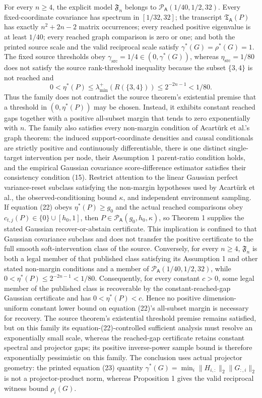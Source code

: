 For every \(n\ge4\), the explicit model \(\mathfrak F_n\) belongs to \(\mathcal P_{\mathsf A}(1/40,1/2,32)\). Every fixed-coordinate covariance has spectrum in \([1/32,32]\); the transcript \(\mathfrak T_{\mathsf A}(P)\) has exactly \(n^2+2n-2\) matrix occurrences; every reached positive eigenvalue is at least \(1/40\); every reached graph comparison is zero or one; and both the printed source scale and the valid reciprocal scale satisfy \(\gamma^{\ast}(G)=\rho^{\ast}(G)=1\). The fixed source thresholds obey \(\gamma_{\mathrm{src}}=1/4\in(0,\gamma^{\ast}(G))\), whereas \(\eta_{\mathrm{src}}=1/80\) does not satisfy the source rank-threshold inequality because the subset \(\{3,4\}\) is not reached and
\[
0<\eta^{\ast}(P)\le\lambda_{\min}^{+}(R(\{3,4\}))\le2^{-2n-1}<1/80.
\]
Thus the family does not contradict the source theorem's existential premise that a threshold in \((0,\eta^{\ast}(P))\) may be chosen. Instead, it exhibits constant reached gaps together with a positive all-subset margin that tends to zero exponentially with \(n\). The family also satisfies every non-margin condition of Acartürk et al.'s graph theorem: the induced support-coordinate densities and causal conditionals are strictly positive and continuously differentiable, there is one distinct single-target intervention per node, their Assumption 1 parent-ratio condition holds, and the empirical Gaussian covariance score-difference estimator satisfies their consistency condition (15).
Restrict attention to the linear Gaussian perfect variance-reset subclass satisfying the non-margin hypotheses used by Acartürk et al., the observed-conditioning bound \(\kappa\), and independent environment sampling. If equation (22) obeys \(\eta^{\ast}(P)\ge g_0\) and the actual reached comparisons obey \(c_{t,j}(P)\in\{0\}\cup[h_0,1]\), then \(P\in\mathcal P_{\mathsf A}(g_0,h_0,\kappa)\), so Theorem 1 supplies the stated Gaussian recover-or-abstain certificate. This implication is confined to that Gaussian covariance subclass and does not transfer the positive certificate to the full smooth soft-intervention class of the source. Conversely, for every \(n\ge4\), \(\mathfrak F_n\) is both a legal member of that published class satisfying its Assumption 1 and other stated non-margin conditions and a member of \(\mathcal P_{\mathsf A}(1/40,1/2,32)\), while \(0<\eta^{\ast}(P)\le2^{-2n-1}<1/80\). Consequently, for every constant \(c>0\), some legal member of the published class is recoverable by the constant-reached-gap Gaussian certificate and has \(0<\eta^{\ast}(P)<c\). Hence no positive dimension-uniform constant lower bound on equation (22)'s all-subset margin is necessary for recovery. The source theorem's existential threshold premise remains satisfied, but on this family its equation-(22)-controlled sufficient analysis must resolve an exponentially small scale, whereas the reached-gap certificate retains constant spectral and projector gaps; its positive inverse-power sample bound is therefore exponentially pessimistic on this family. The conclusion uses actual projector geometry: the printed equation (23) quantity \(\gamma^{\ast}(G)=\min_i\|H_{i,:}\|_2\|G_{:,i}\|_2\) is not a projector-product norm, whereas Proposition 1 gives the valid reciprocal witness bound \(\rho_i(G)\).
